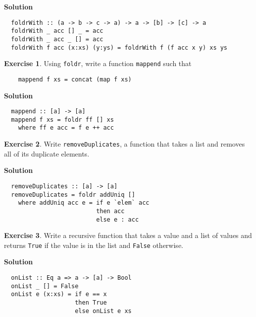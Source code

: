 \documentclass[11pt,a4paper]{article}
\theoremstyle{definition}
\newtheorem{exr}{Exercise}
\begin{document}
\textbf{Solution}
\begin{lstlisting}
  foldrWith :: (a -> b -> c -> a) -> a -> [b] -> [c] -> a
  foldrWith _ acc [] _ = acc
  foldrWith _ acc _ [] = acc
  foldrWith f acc (x:xs) (y:ys) = foldrWith f (f acc x y) xs ys
\end{lstlisting}


\vspace{5mm}

\begin{exr}
  Using \texttt{foldr}, write a function \texttt{mappend} such that

  \begin{lstlisting}
    mappend f xs = concat (map f xs)
  \end{lstlisting}
\end{exr}

\textbf{Solution}
\begin{lstlisting}
  mappend :: [a] -> [a]
  mappend f xs = foldr ff [] xs
    where ff e acc = f e ++ acc
\end{lstlisting}


\vspace{5mm}

\begin{exr}
  Write \texttt{removeDuplicates}, a function that takes a list and 
  removes all of its duplicate elements.
\end{exr}

\textbf{Solution}
\begin{lstlisting}
  removeDuplicates :: [a] -> [a]
  removeDuplicates = foldr addUniq []
    where addUniq acc e = if e `elem` acc
                          then acc
                          else e : acc
\end{lstlisting}


\vspace{5mm}

\begin{exr}
  Write a recursive function that takes a value and a list of values and returns 
  \texttt{True} if the value is in the list and \texttt{False} otherwise.
\end{exr}

\textbf{Solution}
\begin{lstlisting}
  onList :: Eq a => a -> [a] -> Bool
  onList _ [] = False
  onList e (x:xs) = if e == x
                    then True
                    else onList e xs
\end{lstlisting}
\end{document}
